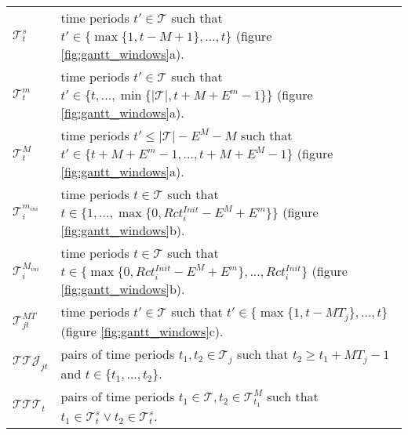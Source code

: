 \documentclass[a4paper,onecolumn,fleqn]{article}
\begin{document}
        \begin{tabular}{p{8mm}p{117mm}}
            $\mathcal{T}^s_t$ &  time periods $t' \in \mathcal{T}$ such that $t' \in \{ \max{\{1, t - M+1\}},  ..., {t}\}$ (figure \ref{fig:gantt_windows}a). \\
            $\mathcal{T}^m_t$ &  time periods $t' \in \mathcal{T}$ such that $t' \in \{ {t}, ..., \min{\{|\mathcal{T}|, t + M + E^m-1\}}\}$ (figure \ref{fig:gantt_windows}a). \\
            $\mathcal{T}^M_t$ &  time periods $t' \leq |\mathcal{T}| - E^M - M$ such that $t' \in \{ t + M + E^m-1 , ...,  t + M + E^M-1 \}$ (figure \ref{fig:gantt_windows}a). \\
            $\mathcal{T}^{m_{ini}}_i$ &  time periods $t \in \mathcal{T}$ such that $t \in \{ 1, ..., \max{\{0, Rct^{Init}_i - E^M + E^m \}}\}$ (figure \ref{fig:gantt_windows}b). \\
            $\mathcal{T}^{M_{ini}}_i$ &  time periods $t \in \mathcal{T}$ such that $t \in \{ \max{\{0, Rct^{Init}_i - E^M + E^m \}} , ...,  Rct^{Init}_i \}$ (figure \ref{fig:gantt_windows}b). \\
            $\mathcal{T}^{MT}_{jt}$ &  time periods $t' \in \mathcal{T}$ such that $t' \in \{ \max{\{1, t - MT_j\}},  ..., {t}\}$ (figure \ref{fig:gantt_windows}c). \\
            $\mathcal{T}\mathcal{T}\mathcal{J}_{jt}$ & pairs of time periods $t_1, t_2 \in \mathcal{T}_j$ such that $t_2 \ge t_1 + MT_j-1$ and $t \in \{t_1, ..., t_2\}$. \\
            $\mathcal{T}\mathcal{T}\mathcal{T}_{t}$ & pairs of time periods $t_1 \in \mathcal{T}, t_2 \in \mathcal{T}^M_{t_1}$ such that $t_1 \in \mathcal{T}^s_{t} \lor t_2 \in \mathcal{T}^s_{t}$. \\
        \end{tabular}
\end{document}
